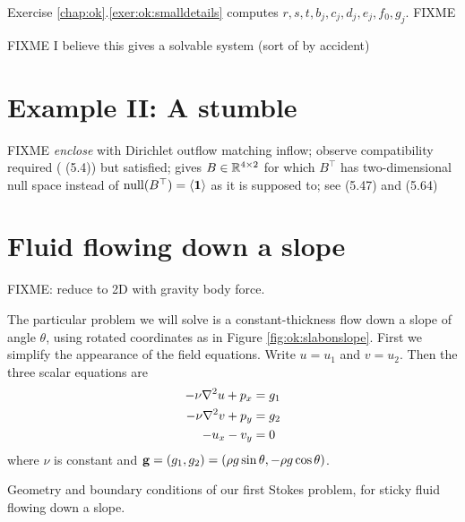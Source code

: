 Exercise \ref{chap:ok}.\ref{exer:ok:smalldetails} computes $r,s,t,b_j,c_j,d_j,e_j,f_0,g_j$.  FIXME

FIXME  I believe this gives a solvable system (sort of by accident)


\section{Example II: A stumble}

FIXME \emph{enclose} with Dirichlet outflow matching inflow; observe compatibility required (\citep{Elmanetal2005} (5.4)) but satisfied; gives $B \in \mathbb{R}^{4\times 2}$ for which $B^\top$ has two-dimensional null space instead of $\operatorname{null}(B^\top) = \left<\mathbf{1}\right>$ as it is supposed to; see \citep{Elmanetal2005} (5.47) and (5.64)



\section{Fluid flowing down a slope}

FIXME: reduce to 2D with gravity body force.

The particular problem we will solve is a constant-thickness flow down a slope of angle $\theta$, using rotated coordinates as in Figure \ref{fig:ok:slabonslope}.  First we simplify the appearance of the field equations.  Write $u=u_1$ and $v=u_2$.  Then the three scalar equations are
\begin{align}
-\nu \nabla^2 u + p_x &= g_1 \label{eq:ok:stokes2du} \\
-\nu \nabla^2 v + p_y &= g_2 \label{eq:ok:stokes2dv} \\
- u_x - v_y &= 0 \label{eq:ok:stokes2dincomp}
\end{align}
where $\nu$ is constant and $\mathbf{g} = (g_1,g_2) = (\rho g \sin \theta, - \rho g \cos \theta)$.

\begin{marginfigure}

\caption{Geometry and boundary conditions of our first Stokes problem, for sticky fluid flowing down a slope.}
\label{fig:ok:slabonslope}
\end{marginfigure}

